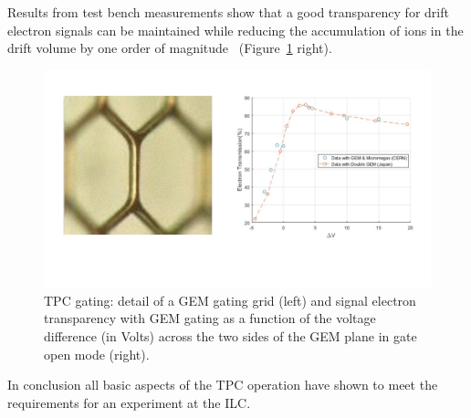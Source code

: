 Results from test bench measurements show that a good transparency for drift electron signals can be maintained while reducing the accumulation of ions in the drift volume by one order of magnitude~\cite{ild:bib:TPC_gatingpaper} (Figure~\ref{fig:det:TPC_gating} right).

\begin{figure}[t!]
\centering
\includegraphics[width=1.0\hsize]{Detector/fig/TPC_gating.jpg}
\caption{TPC gating: detail of a GEM gating grid (left) and signal electron transparency with GEM gating as a function of the voltage difference (in Volts) across the two sides of the GEM plane in gate open mode (right).} 
\label{fig:det:TPC_gating}
\end{figure}

In conclusion all basic aspects of the TPC operation have shown to meet the requirements for an experiment at the ILC. 